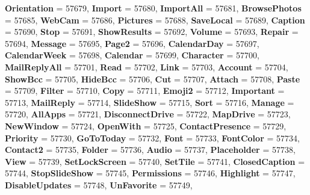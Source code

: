 \begin{DoxyCompactItemize}
{\bfseries Orientation} = 57679, 
{\bfseries Import} = 57680, 
\newline
{\bfseries Import\+All} = 57681, 
{\bfseries Browse\+Photos} = 57685, 
{\bfseries Web\+Cam} = 57686, 
{\bfseries Pictures} = 57688, 
\newline
{\bfseries Save\+Local} = 57689, 
{\bfseries Caption} = 57690, 
{\bfseries Stop} = 57691, 
{\bfseries Show\+Results} = 57692, 
\newline
{\bfseries Volume} = 57693, 
{\bfseries Repair} = 57694, 
{\bfseries Message} = 57695, 
{\bfseries Page2} = 57696, 
\newline
{\bfseries Calendar\+Day} = 57697, 
{\bfseries Calendar\+Week} = 57698, 
{\bfseries Calendar} = 57699, 
{\bfseries Character} = 57700, 
\newline
{\bfseries Mail\+Reply\+All} = 57701, 
{\bfseries Read} = 57702, 
{\bfseries Link} = 57703, 
{\bfseries Account} = 57704, 
\newline
{\bfseries Show\+Bcc} = 57705, 
{\bfseries Hide\+Bcc} = 57706, 
{\bfseries Cut} = 57707, 
{\bfseries Attach} = 57708, 
\newline
{\bfseries Paste} = 57709, 
{\bfseries Filter} = 57710, 
{\bfseries Copy} = 57711, 
{\bfseries Emoji2} = 57712, 
\newline
{\bfseries Important} = 57713, 
{\bfseries Mail\+Reply} = 57714, 
{\bfseries Slide\+Show} = 57715, 
{\bfseries Sort} = 57716, 
\newline
{\bfseries Manage} = 57720, 
{\bfseries All\+Apps} = 57721, 
{\bfseries Disconnect\+Drive} = 57722, 
{\bfseries Map\+Drive} = 57723, 
\newline
{\bfseries New\+Window} = 57724, 
{\bfseries Open\+With} = 57725, 
{\bfseries Contact\+Presence} = 57729, 
{\bfseries Priority} = 57730, 
\newline
{\bfseries Go\+To\+Today} = 57732, 
{\bfseries Font} = 57733, 
{\bfseries Font\+Color} = 57734, 
{\bfseries Contact2} = 57735, 
\newline
{\bfseries Folder} = 57736, 
{\bfseries Audio} = 57737, 
{\bfseries Placeholder} = 57738, 
{\bfseries View} = 57739, 
\newline
{\bfseries Set\+Lock\+Screen} = 57740, 
{\bfseries Set\+Tile} = 57741, 
{\bfseries Closed\+Caption} = 57744, 
{\bfseries Stop\+Slide\+Show} = 57745, 
\newline
{\bfseries Permissions} = 57746, 
{\bfseries Highlight} = 57747, 
{\bfseries Disable\+Updates} = 57748, 
{\bfseries Un\+Favorite} = 57749, 
\newline

\end{DoxyCompactItemize}
